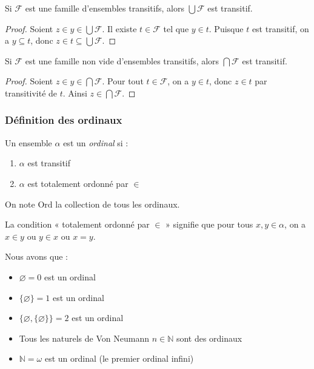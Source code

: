 \begin{proposition}\label{prop:trans_reunion}
	Si $\mathcal{F}$ est une famille d'ensembles transitifs, alors $\bigcup \mathcal{F}$ est transitif.
\end{proposition}

\begin{proof}
	Soient $z \in y \in \bigcup \mathcal{F}$. Il existe $t \in \mathcal{F}$ tel que $y \in t$. Puisque $t$ est transitif, on a $y \subseteq t$, donc $z \in t \subseteq \bigcup \mathcal{F}$.
\end{proof}

\begin{proposition}\label{prop:trans_intersection}
	Si $\mathcal{F}$ est une famille non vide d'ensembles transitifs, alors $\bigcap \mathcal{F}$ est transitif.
\end{proposition}

\begin{proof}
	Soient $z \in y \in \bigcap \mathcal{F}$. Pour tout $t \in \mathcal{F}$, on a $y \in t$, donc $z \in t$ par transitivité de $t$. Ainsi $z \in \bigcap \mathcal{F}$.
\end{proof}

\subsubsection{Définition des ordinaux}

\begin{definition}[Ordinal]
	Un ensemble $\alpha$ est un \emph{ordinal} si :
	\begin{enumerate}
		\item $\alpha$ est transitif
		\item $\alpha$ est totalement ordonné par $\in$
	\end{enumerate}
	On note $\mathrm{Ord}$ la collection de tous les ordinaux.
\end{definition}

\begin{remarque}
	La condition « totalement ordonné par $\in$ » signifie que pour tous $x, y \in \alpha$, on a $x \in y$ ou $y \in x$ ou $x = y$.
\end{remarque}

\begin{exemple}
	Nous avons que :
	\begin{itemize}
		\item $\varnothing = 0$ est un ordinal
		\item $\{\varnothing\} = 1$ est un ordinal
		\item $\{\varnothing, \{\varnothing\}\} = 2$ est un ordinal
		\item Tous les naturels de Von Neumann $n \in \mathbb{N}$ sont des ordinaux
		\item $\mathbb{N} = \omega$ est un ordinal (le premier ordinal infini)
	\end{itemize}
\end{exemple}

